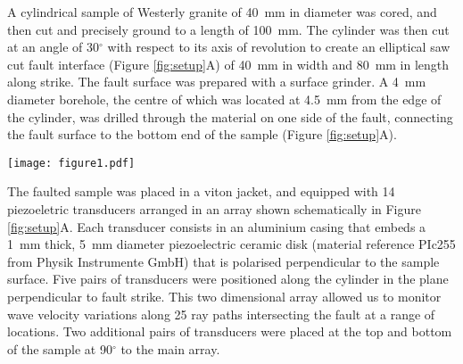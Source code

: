 \documentclass[grl]{agutex2arxiv}
\begin{document}
\begin{article}
A cylindrical sample of Westerly granite of 40~mm in diameter was cored, and then cut and precisely ground to a length of 100~mm. The cylinder was then cut at an angle of 30$^\circ$ with respect to its axis of revolution to create an elliptical saw cut fault interface (Figure \ref{fig:setup}A) of 40~mm in width and 80~mm in length along strike. The fault surface was prepared with a surface grinder. A 4~mm diameter borehole, the centre of which was located at 4.5~mm from the edge of the cylinder, was drilled through the material on one side of the fault, connecting the fault surface to the bottom end of the sample (Figure \ref{fig:setup}A).


\begin{figure*}
\begin{center}
\texttt{[image: figure1.pdf]}
\end{center}
\caption{Experimental setup. (A) Schematic of the sample assembly. The length of the fault is 8 cm along strike. Injection is conducted in the bottom sample through a borehole reaching the fault surface. (B) Fluid pressure, shear stress and slip measured during a sliding test at constant pressure (left of dotted vertical line) and during a fluid injection test at 1 MPa/min and initial shear stress equal to 90\% of the static frictional strength.}
\label{fig:setup}
\end{figure*}


The faulted sample was placed in a viton jacket, and equipped with 14 piezoeletric transducers arranged in an array shown schematically in Figure \ref{fig:setup}A. Each transducer consists in an aluminium casing that embeds a 1~mm thick, 5~mm diameter piezoelectric ceramic disk (material reference PIc255 from Physik Instrumente GmbH) that is polarised perpendicular to the sample surface. Five pairs of transducers were positioned along the cylinder in the plane perpendicular to fault strike. This two dimensional array allowed us to monitor wave velocity variations along 25 ray paths intersecting the fault at a range of locations. Two additional pairs of transducers were placed at the top and bottom of the sample at 90$^\circ$ to the main array.


\end{article}
\end{document}
